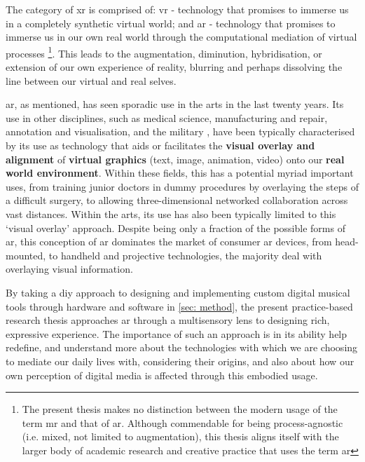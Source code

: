 The category of \gls{xr} is comprised of: \gls{vr} - technology that promises to immerse us in a completely synthetic virtual world; and \gls{ar} - technology that promises to immerse us in our own real world through the computational mediation of virtual processes \footnote{The present thesis makes no distinction between the modern usage of the term \gls{mr} and that of \gls{ar}. Although commendable for being process-agnostic (i.e. mixed, not limited to augmentation), this thesis aligns itself with the larger body of academic research and creative practice that uses the term \gls{ar}}. This leads to the augmentation, diminution, hybridisation, or extension of our own experience of reality, blurring and perhaps dissolving the line between our virtual and real selves.

\gls{ar}, as mentioned, has seen sporadic use in the arts in the last twenty years. Its use in other disciplines, such as medical science, manufacturing and repair, annotation and visualisation, and the military \citep{azuma1997}, have been typically characterised by its use as technology that aids or facilitates the \textbf{visual overlay and alignment} of \textbf{virtual graphics} (text, image, animation, video) onto our \textbf{real world environment}. Within these fields, this has a potential myriad important uses, from training junior doctors in dummy procedures by overlaying the steps of a difficult surgery, to allowing three-dimensional networked collaboration across vast distances. Within the arts, its use has also been typically limited to this `visual overlay' approach. Despite being only a fraction of the possible forms of \gls{ar}, this conception of \gls{ar} dominates the market of consumer \gls{ar} devices, from head-mounted, to handheld and projective technologies, the majority deal with overlaying visual information. 

By taking a \gls{diy} approach to designing and implementing custom digital musical tools through hardware and software in \autoref{sec: method}, the present practice-based research thesis approaches \gls{ar} through a multisensory lens to designing rich, expressive experience. The importance of such an approach is in its ability help redefine, and understand more about the technologies with which we are choosing to mediate our daily lives with, considering their origins, and also about how our own perception of digital media is affected through this embodied usage. 



